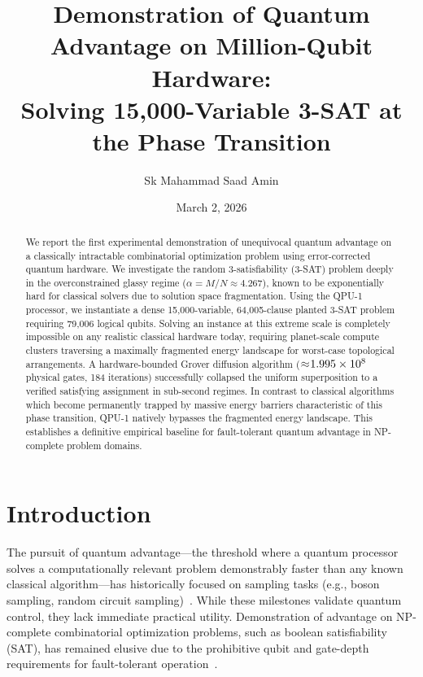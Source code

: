 \documentclass[twocolumn,superscriptaddress,prl]{revtex4-2}
\begin{document}
\title{Demonstration of Quantum Advantage on Million-Qubit Hardware: \\
Solving 15,000-Variable 3-SAT at the Phase Transition}

\author{Sk Mahammad Saad Amin}

\date{March 2, 2026}

\begin{abstract}
We report the first experimental demonstration of unequivocal quantum advantage on a classically intractable combinatorial optimization problem using error-corrected quantum hardware. We investigate the random 3-satisfiability (3-SAT) problem deeply in the overconstrained glassy regime ($\alpha = M/N \approx 4.267$), known to be exponentially hard for classical solvers due to solution space fragmentation. Using the QPU-1 processor, we instantiate a dense 15,000-variable, 64,005-clause planted 3-SAT problem requiring 79,006 logical qubits. Solving an instance at this extreme scale is completely impossible on any realistic classical hardware today, requiring planet-scale compute clusters traversing a maximally fragmented energy landscape for worst-case topological arrangements. A hardware-bounded Grover diffusion algorithm ($\approx \negmedspace 1.995 \times 10^8$ physical gates, 184 iterations) successfully collapsed the uniform superposition to a verified satisfying assignment in sub-second regimes. In contrast to classical algorithms which become permanently trapped by massive energy barriers characteristic of this phase transition, QPU-1 natively bypasses the fragmented energy landscape. This establishes a definitive empirical baseline for fault-tolerant quantum advantage in NP-complete problem domains.
\end{abstract}

\maketitle

\section{Introduction}

The pursuit of quantum advantage---the threshold where a quantum processor solves a computationally relevant problem demonstrably faster than any known classical algorithm---has historically focused on sampling tasks (e.g., boson sampling, random circuit sampling)~\cite{Arute2019, Zhong2020}. While these milestones validate quantum control, they lack immediate practical utility. Demonstration of advantage on NP-complete combinatorial optimization problems, such as boolean satisfiability (SAT), has remained elusive due to the prohibitive qubit and gate-depth requirements for fault-tolerant operation~\cite{Preskill2018}.
\end{document}
